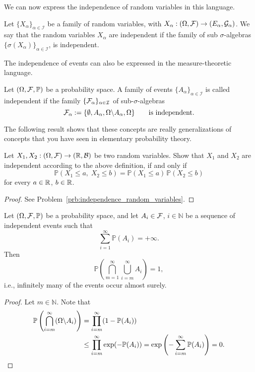 We can now express the independence of random variables in this language.

\begin{definition}
	Let $\{X_\alpha\}_{\alpha \in \mathcal{I}}$ be a family of random variables, with $X_\alpha:(\Omega, \mathcal F) \to (E_\alpha, \mathcal{G}_\alpha)$. We say that the random variables $X_\alpha$ are independent if the family of sub $\sigma$-algebras $\{\sigma(X_\alpha)\}_{\alpha \in \mathcal{I}}$, is independent.
\end{definition}

The independence of events can also be expressed in the measure-theoretic language.

\begin{definition}
	Let $(\Omega, \mathcal F, \mathbb{P})$ be a probability space. A family of events $\{A_\alpha\}_{\alpha \in \mathcal{I}}$ is called independent if the family $\{ \mathcal F_\alpha \}_{\alpha\in\mathcal{I}}$ of sub-$\sigma$-algebras
	\[
	\mathcal F_\alpha := \{ \emptyset, A_\alpha, \Omega \backslash A_\alpha, \Omega \}\qquad\text{is independent.}
	\]	
\end{definition}

The following result shows that these concepts are really generalizations of concepts that you have seen in elementary probability theory.

\begin{lemma}\label{lem:independence_random_variables}
Let $X_1, X_2: (\Omega, \mathcal F) \to (\mathbb R, \mathcal B)$ be two random variables. Show that $X_1$ and $X_2$ are independent according to the above definition, if and only if 
	\[
	\mathbb{P}( X_1 \leq a,\; X_2 \leq b ) = \mathbb{P}(X_1 \leq a)\, \mathbb{P}(X_2 \leq b)
	\]
	for every $a \in \mathbb R$, $b \in \mathbb R$.
\end{lemma}

\begin{proof}
See Problem~\ref{prb:independence_random_variables}.
\end{proof}

\begin{theorem}
	Let $(\Omega, \mathcal F, \mathbb{P})$ be a probability space, and let $A_i \in \mathcal F$, $i \in \mathbb{N}$ be a sequence of independent events such that
	\[
		\sum_{i=1}^\infty \mathbb{P}(A_i) = +\infty.
	\]
	Then
	\[
	\mathbb{P} \left( \bigcap_{m = 1}^\infty \bigcup_{i=m}^\infty A_i \right) = 1,
	\]
	i.e., infinitely many of the events occur almost surely.
\end{theorem}
\begin{proof}
	Let $m \in \mathbb{N}$. Note that
	\begin{align*}
	\mathbb{P}\left(\bigcap_{i=m}^{\infty} (\Omega \backslash A_i) \right) &= 
	\prod_{i=m}^\infty (1 - \mathbb{P}(A_i)) \\
	&\leq \prod_{i=m}^\infty \exp(- \mathbb{P}(A_i)) 
	= \exp\left(- \sum_{i=m}^\infty \mathbb{P}(A_i)\right) = 0.\qedhere
	\end{align*}
\end{proof}

